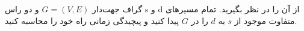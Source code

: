 گراف جهت‌دار $G = (V, E)$ و دو راس s و d از آن را در نظر بگیرید. تمام مسیرهای متفاوت موجود از $s$ به $d$ را در $G$ پیدا کنید و پیچیدگی زمانی راه خود را محاسبه کنید.
